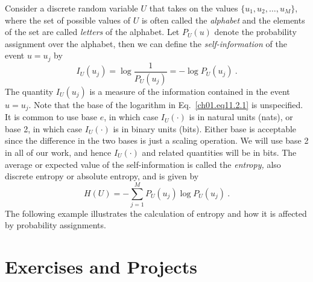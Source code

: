 Consider a discrete random variable $U$ that takes on
the values $\{u_1, u_2, \dots, u_M\}$, where the set of possible
values of $U$ is often called the \textit{alphabet} and the elements
of the set are called \textit{letters} of the alphabet. Let $P_U(u)$
denote the probability  assignment  over the alphabet, then we can
define the \textit{self-information} of the event $ u = u_j $ by
\begin{equation}
  I_U \left( u_j \right) = \log \frac{1}{P_U (u_j)} = - \log P_U
    \left( u_j \right)~.
\label{ch01.eq11.2.1}
\end{equation}
The quantity $I_U (u_j) $ is a measure  of the information  contained
in the event $ u = u_j$. Note that the base of the logarithm in
Eq.~\eqref{ch01.eq11.2.1} is unspecified. It is common
to use base $e$, in which case $I_U (\cdot) $ is in natural units (nats),
or base 2,  in which case $I_U(\cdot)$ is in binary units (bits).
Either base is acceptable since the difference in the two bases is just a
scaling operation. We will use base 2 in all of our work,
and hence $I_U(\cdot)$ and related quantities will be in bits.
The average or expected value of the self-information is called the
\textit{entropy,} also discrete entropy or absolute entropy, and is given by
\begin{equation}
 \displaystyle H(U) = - \sum^M_{j=1} P_U \left(u_j\right)
    \log P_U \left(u_j \right)~.
\label{ch01.eq11.2.2}
\end{equation}
The following example illustrates the calculation of entropy and how it is
affected by probability assignments.

\section{Exercises and Projects} 
\label{cbir:exercises}

